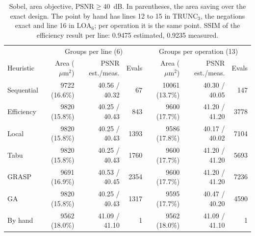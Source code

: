\documentclass[11pt,a4paper]{article}
\begin{document}
\begin{table}[h]
\centering
\small
{}
\begin{tabular}{|l|r|r|r|r|r|r|}
\hline
\rowcolor{tabAzul}\color{white} &
  \multicolumn{3}{c|}{\color{white} Groups per line (6)} &
  \multicolumn{3}{c|}{\color{white} Groups per operation (13)} \\
\rowcolor{tabAzul}\color{white} Heuristic & \color{white} Area ($\mu\text{m}^2$) & \color{white} PSNR est./meas. &
  \color{white} Evals & \color{white} Area ($\mu\text{m}^2$) & \color{white} PSNR est./meas. & \color{white} Evals \\
\hline
Sequential & 9722 (16.6\%) & 40.56 / 40.32 & 67   & 10061 (13.7\%) & 40.30 / 40.05 & 147  \\
Efficiency & 9820 (15.8\%) & 40.25 / 40.43 & 843  & 9600 (17.7\%)  & 41.20 / 41.20 & 3778 \\
Local      & 9820 (15.8\%) & 40.25 / 40.43 & 1393 & 9586 (17.8\%)  & 40.17 / 40.02 & 7104 \\
Tabu       & 9820 (15.8\%) & 40.25 / 40.43 & 1760 & 9600 (17.7\%)  & 41.20 / 41.20 & 5693 \\
GRASP      & 9691 (16.9\%) & 40.53 / 40.45 & 2354 & 9600 (17.7\%)  & 41.20 / 41.20 & 7236 \\
GA         & 9820 (15.8\%) & 40.25 / 40.43 & 1317 & 9595 (17.7\%)  & 40.47 / 40.20 & 4590 \\
By hand    & 9562 (18.0\%) & 41.09 / 41.10 & 1    & 9562 (18.0\%)  & 41.09 / 41.10 & 1    \\
\hline
\end{tabular}
\caption{Sobel, area objective, $\text{PSNR} \ge 40$~dB. In parentheses, the area saving over the exact design. The
point by hand has lines 12 to 15 in $\text{TRUNC}_3$, the negations exact and line 16 in $\text{LOA}_6$; per
operation it is the same point. SSIM of the efficiency result per line: 0.9475 estimated, 0.9235 measured.}
\label{tab:sobel}
\end{table}
\end{document}
